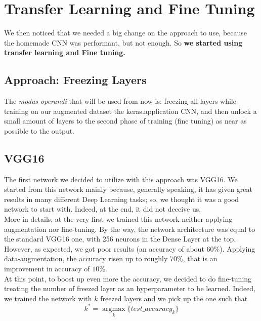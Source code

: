 \documentclass[11pt]{article}
\begin{document}
\section{Transfer Learning and Fine Tuning}
We then noticed that we needed a big change on the approach to use, because the homemade
CNN was performant, but not enough. So \textbf{we started using transfer learning and Fine tuning.}

\subsection{Approach: Freezing Layers}
The \textit{modus operandi} that will be used from now is: freezing all layers while training on our augmented dataset the keras.application
CNN, and then unlock a small amount of layers to the second phase of training (fine tuning) as near as possible to the output.
\subsection{VGG16}
The first network we decided to utilize with this approach was VGG16. We started from this network mainly because, generally speaking, it has given great results in many different Deep Learning tasks; so, we thought it was a good network to start with. Indeed, at the end, it did not deceive us.\\[0.1cm] More in details, at the very first we trained this network neither applying augmentation nor fine-tuning. By the way, the network architecture was equal to the standard VGG16 one, with 256 neurons in the Dense Layer at the top. However, as expected, we got poor results (an accuracy of about $60\%$). Applying data-augmentation, the accuracy risen up to roughly $70\%$, that is an improvement in accuracy of $10\%$.\\[0.1cm]
At this point, to boost up even more the accuracy, we decided to do fine-tuning treating the number of freezed layer as an hyperparameter to be learned. Indeed, we trained the network with $k$ freezed layers and we pick up the one such that
\begin{equation*}
    k^* = \underset{k}{\operatorname{argmax}}\{test\_accuracy_{k}\}
\end{equation*}
\end{document}
